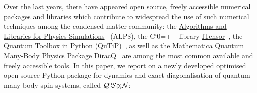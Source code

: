 \documentclass{SciPost}
\newcommand\0{\scalebox{-1}[1]{0}}
\let\svttfamily\ttfamily
\renewcommand\ttfamily{\svttfamily\catcode`0=\active }
\renewcommand\texttt{\bgroup\ttfamily\texttthelp}
\def\texttthelp#1{#1\egroup}
\newcommand{\qspin}{$\mathcal{Q}^{\mathrm{u}}\!\mathcal{S}\uprho\mathrm{\text{\textexclamdown}}\mathcal{N}$}
\begin{document}
Over the last years, there have appeared open source, freely accessible numerical packages and libraries which contribute to widespread the use of such numerical techniques among the condensed matter community: the \href{http://alps.comp-phys.org/mediawiki/index.php/Main_Page}{Algorithms and Libraries for Physics Simulations}~\cite{alet05,albuquerque2007,bauer11,dolfi14} (ALPS), the C\texttt{++} library \href{http://itensor.org/}{ITensor}~\cite{ITensor}, the \href{http://qutip.org/}{Quantum Toolbox in Python} (QuTiP)~\cite{johansson2012,johansson2013}, as well as the Mathematica Quantum Many-Body Physics Package \href{http://diracq.org/}{DiracQ}~\cite{wright_13} are among the most common available and freely accessible tools. In this paper, we report on a newly developed optimised open-source Python package for dynamics and exact diagonalisation of quantum many-body spin systems, called \qspin:
\end{document}
